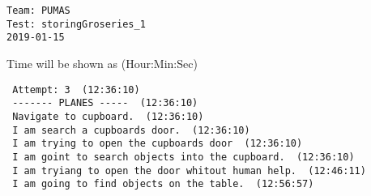 \documentclass{article}
\begin{document}
\begin{center}
\begingroup
\fontsize{16pt}{17pt}\selectfont
\begin{BVerbatim}
Team: PUMAS
Test: storingGroseries_1
2019-01-15
\end{BVerbatim}
\endgroup 
\end{center}
\begingroup
\fontsize{9pt}{9pt}\selectfont
\begin{quoting}[indentfirst=true]
\hspace*{\fill} Time will be shown as (Hour:Min:Sec)\\
\end{quoting}
\endgroup
\verb| Attempt: 3  (12:36:10) |\\
\verb| ------- PLANES -----  (12:36:10) |\\
\verb| Navigate to cupboard.  (12:36:10) |\\
\verb| I am search a cupboards door.  (12:36:10) |\\
\verb| I am trying to open the cupboards door  (12:36:10) |\\
\verb| I am goint to search objects into the cupboard.  (12:36:10) |\\
\verb| I am tryiang to open the door whitout human help.  (12:46:11) |\\
\verb| I am going to find objects on the table.  (12:56:57) |\\
\end{document}

